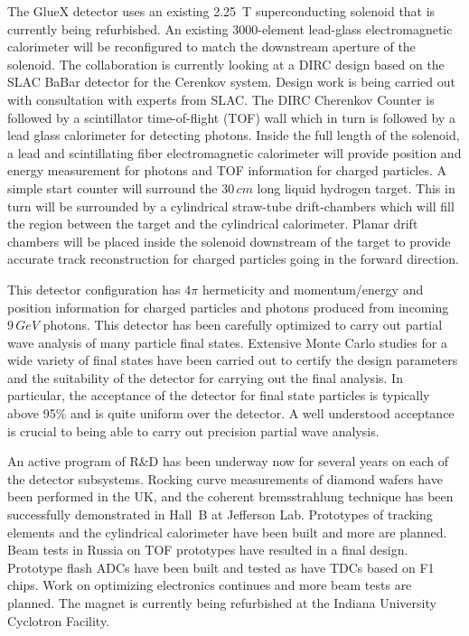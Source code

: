 \hspace{1cm}
The GlueX detector uses an existing 2.25~T 
superconducting solenoid that is currently being refurbished.  An existing 
3000-element lead-glass electromagnetic calorimeter will be reconfigured 
to match the downstream aperture of the solenoid. The collaboration is
currently looking at a DIRC design based on the SLAC BaBar detector for the
Cerenkov system. Design work is being carried out with consultation 
with experts from SLAC. The DIRC Cherenkov Counter is followed by a scintillator 
time-of-flight (TOF) wall which in turn is followed by a lead glass 
calorimeter for detecting photons.  Inside the full length of the solenoid,
a lead and scintillating fiber electromagnetic calorimeter will provide 
position and energy measurement for photons and TOF information for charged 
particles.  A simple start counter will surround the $30\, cm$ long liquid hydrogen
target. This in turn will be surrounded by a cylindrical straw-tube drift-chambers 
which will fill the region between the target and the cylindrical calorimeter.  
Planar drift chambers will be placed inside the solenoid downstream of the target
to provide accurate track reconstruction for charged particles going in the 
forward direction.


\hspace{1cm}
This detector configuration has $4 \pi$ hermeticity and momentum/energy and
position information for charged particles and photons produced from 
incoming $9\, GeV$ photons. This detector has been carefully optimized to 
carry out partial wave analysis of many particle final states.  Extensive Monte 
Carlo studies for a wide variety of final states have been carried out to 
certify the design parameters and the suitability of the detector for carrying 
out the final analysis. In particular, the acceptance of the detector for
final state particles is typically above 95\% and is quite uniform over 
the detector. A well understood acceptance is crucial to being able to carry
out precision partial wave analysis. 


\hspace{1cm}
An active program of R\&D has been underway now for several years on each of the 
detector subsystems. Rocking curve measurements of diamond wafers have 
been performed  in the UK, and the coherent bremsstrahlung technique has been 
successfully demonstrated in Hall~B at Jefferson Lab. Prototypes of tracking 
elements and the cylindrical calorimeter have been built and more are planned.  
Beam tests in Russia on TOF prototypes have resulted in a final design.  
Prototype flash ADCs have been built and tested as have TDCs based on F1 chips.  
Work on optimizing electronics continues and more beam tests are planned.  
The magnet is currently being refurbished at the Indiana University Cyclotron 
Facility. 

